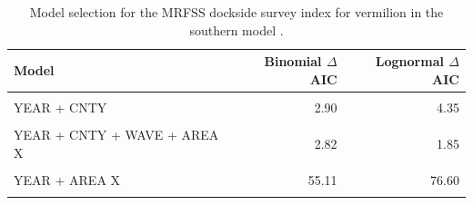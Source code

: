 \documentclass[
  english,
  a4paper,
]{article}
\begin{document}
\begin{table}

\caption{\label{tab:tab-model-select-mrfss}Model selection for the MRFSS dockside survey index for vermilion in the southern model .}
\centering
\begin{tabular}[t]{lrr}
\toprule
Model & Binomial $\Delta$AIC & Lognormal $\Delta$AIC\\
\midrule
\cellcolor{gray!6}{1} & \cellcolor{gray!6}{111.56} & \cellcolor{gray!6}{146.83}\\
YEAR + CNTY & 2.90 & 4.35\\
\cellcolor{gray!6}{YEAR + CNTY + WAVE} & \cellcolor{gray!6}{6.40} & \cellcolor{gray!6}{0.00}\\
YEAR + CNTY + WAVE + AREA X & 2.82 & 1.85\\
\cellcolor{gray!6}{YEAR + WAVE + AREA X} & \cellcolor{gray!6}{57.46} & \cellcolor{gray!6}{75.30}\\
\addlinespace
YEAR + AREA X & 55.11 & 76.60\\
\cellcolor{gray!6}{YEAR + CNTY + AREA X} & \cellcolor{gray!6}{0.00} & \cellcolor{gray!6}{6.19}\\
\bottomrule
\end{tabular}
\end{table}

\FloatBarrier
\end{document}
